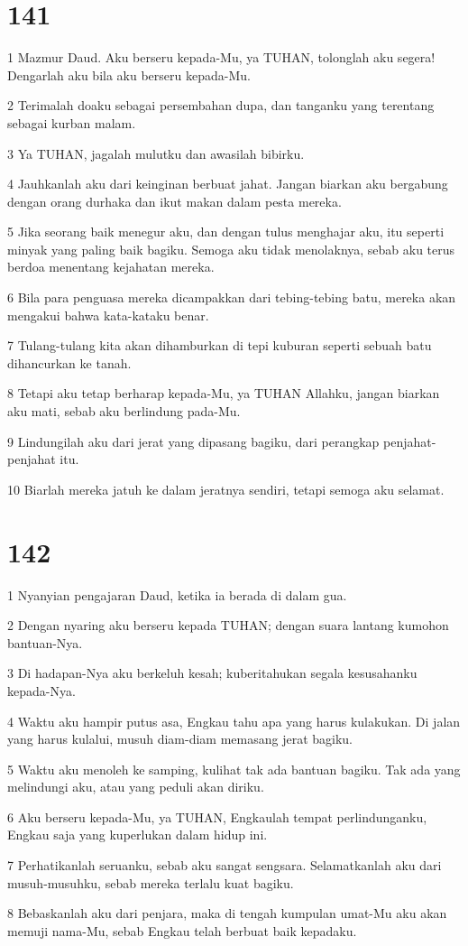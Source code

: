 \chapter{141}

\par 1 Mazmur Daud. Aku berseru kepada-Mu, ya TUHAN, tolonglah aku segera! Dengarlah aku bila aku berseru kepada-Mu.
\par 2 Terimalah doaku sebagai persembahan dupa, dan tanganku yang terentang sebagai kurban malam.
\par 3 Ya TUHAN, jagalah mulutku dan awasilah bibirku.
\par 4 Jauhkanlah aku dari keinginan berbuat jahat. Jangan biarkan aku bergabung dengan orang durhaka dan ikut makan dalam pesta mereka.
\par 5 Jika seorang baik menegur aku, dan dengan tulus menghajar aku, itu seperti minyak yang paling baik bagiku. Semoga aku tidak menolaknya, sebab aku terus berdoa menentang kejahatan mereka.
\par 6 Bila para penguasa mereka dicampakkan dari tebing-tebing batu, mereka akan mengakui bahwa kata-kataku benar.
\par 7 Tulang-tulang kita akan dihamburkan di tepi kuburan seperti sebuah batu dihancurkan ke tanah.
\par 8 Tetapi aku tetap berharap kepada-Mu, ya TUHAN Allahku, jangan biarkan aku mati, sebab aku berlindung pada-Mu.
\par 9 Lindungilah aku dari jerat yang dipasang bagiku, dari perangkap penjahat-penjahat itu.
\par 10 Biarlah mereka jatuh ke dalam jeratnya sendiri, tetapi semoga aku selamat.

\chapter{142}

\par 1 Nyanyian pengajaran Daud, ketika ia berada di dalam gua.
\par 2 Dengan nyaring aku berseru kepada TUHAN; dengan suara lantang kumohon bantuan-Nya.
\par 3 Di hadapan-Nya aku berkeluh kesah; kuberitahukan segala kesusahanku kepada-Nya.
\par 4 Waktu aku hampir putus asa, Engkau tahu apa yang harus kulakukan. Di jalan yang harus kulalui, musuh diam-diam memasang jerat bagiku.
\par 5 Waktu aku menoleh ke samping, kulihat tak ada bantuan bagiku. Tak ada yang melindungi aku, atau yang peduli akan diriku.
\par 6 Aku berseru kepada-Mu, ya TUHAN, Engkaulah tempat perlindunganku, Engkau saja yang kuperlukan dalam hidup ini.
\par 7 Perhatikanlah seruanku, sebab aku sangat sengsara. Selamatkanlah aku dari musuh-musuhku, sebab mereka terlalu kuat bagiku.
\par 8 Bebaskanlah aku dari penjara, maka di tengah kumpulan umat-Mu aku akan memuji nama-Mu, sebab Engkau telah berbuat baik kepadaku.

